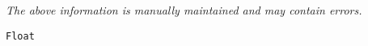 \label{pkg:float}

{\tiny \it The above information is manually maintained and may contain errors.}
\begin{verbatim}
Float
\end{verbatim}
